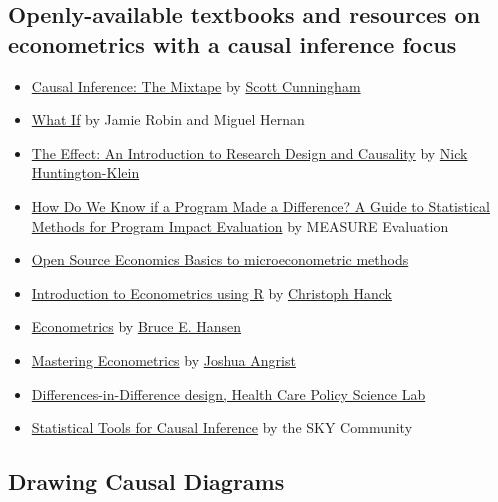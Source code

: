 \documentclass[
]{book}
\providecommand{\tightlist}{%
  \setlength{\itemsep}{0pt}\setlength{\parskip}{0pt}}
\begin{document}
\hypertarget{openly-available-textbooks-and-resources-on-econometrics-with-a-causal-inference-focus}{%
\subsection{Openly-available textbooks and resources on econometrics
with a causal inference
focus}\label{openly-available-textbooks-and-resources-on-econometrics-with-a-causal-inference-focus}}

\begin{itemize}
\tightlist
\item
  \href{https://mixtape.scunning.com/}{Causal Inference: The Mixtape} by
  \href{http://www.scunning.com/}{Scott Cunningham}
\item
  \href{https://www.hsph.harvard.edu/miguel-hernan/causal-inference-book/}{What
  If} by Jamie Robin and Miguel Hernan
\item
  \href{http://nickchk.com/causalitybook.html}{The Effect: An
  Introduction to Research Design and Causality} by
  \href{http://nickchk.com/}{Nick Huntington-Klein}
\item
  \href{https://www.measureevaluation.org/resources/publications/ms-14-87-en.html}{How
  Do We Know if a Program Made a Difference? A Guide to Statistical
  Methods for Program Impact Evaluation} by MEASURE Evaluation
\item
  \href{https://ose-data-science.readthedocs.io/en/latest/lectures/index.html}{Open
  Source Economics Basics to microeconometric methods}
\item
  \href{https://www.econometrics-with-r.org/}{Introduction to
  Econometrics using R} by
  \href{https://www.oek.wiwi.uni-due.de/en/team/christoph-hanck/}{Christoph
  Hanck}
\item
  \href{https://www.ssc.wisc.edu/~bhansen/econometrics/}{Econometrics}
  by \href{https://www.ssc.wisc.edu/~bhansen/}{Bruce E. Hansen}
\item
  \href{https://mru.org/mastering-econometrics}{Mastering Econometrics}
  by \href{https://economics.mit.edu/faculty/angrist}{Joshua Angrist}
\item
  \href{https://diff.healthpolicydatascience.org/}{Differences-in-Difference
  design, Health Care Policy Science Lab}
\item
  \href{https://chabefer.github.io/STCI/}{Statistical Tools for Causal
  Inference} by the SKY Community
\end{itemize}

\hypertarget{drawing-causal-diagrams}{%
\subsection{Drawing Causal Diagrams}\label{drawing-causal-diagrams}}
\end{document}
